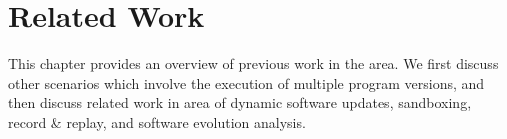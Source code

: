 \chapter{Related Work}
\label{chap:related}

This chapter provides an overview of previous work in the area.  We first
discuss other scenarios which involve the execution of multiple program
versions, and then discuss related work in area of dynamic software updates,
sandboxing, record \& replay, and software evolution analysis.








  


